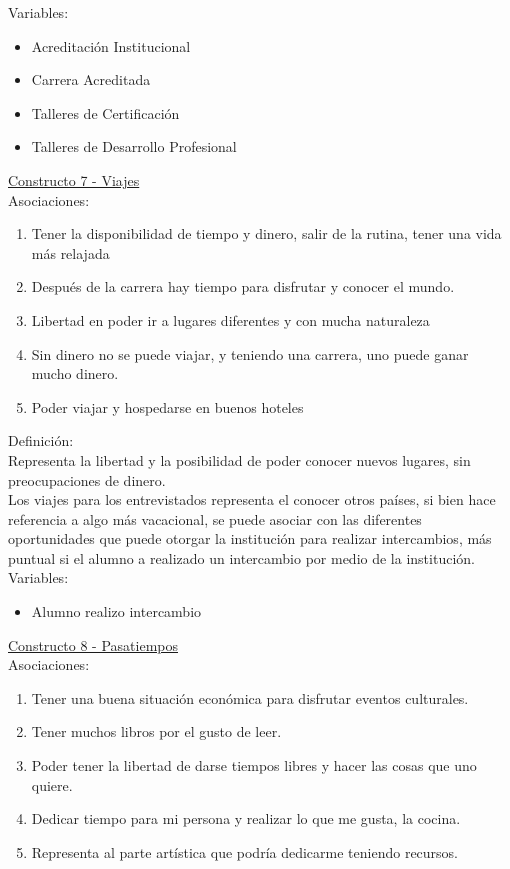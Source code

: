 Variables:\\
\begin{itemize}
	\item Acreditación Institucional
	\item Carrera Acreditada
	\item Talleres de Certificación
	\item Talleres de Desarrollo Profesional	
\end{itemize} 



\underline {Constructo 7 - Viajes} \\
Asociaciones:
\begin{enumerate}
	\item Tener la disponibilidad de tiempo y dinero, salir de la rutina, tener una vida más relajada
	\item Después de la carrera hay tiempo para disfrutar y conocer el mundo. 
	\item Libertad en poder ir a lugares diferentes y con mucha naturaleza
	\item Sin dinero no se puede viajar, y teniendo una carrera, uno puede ganar mucho dinero.	
	\item Poder viajar y hospedarse en buenos hoteles
\end{enumerate}

Definición:\\
Representa la libertad y la posibilidad de poder conocer nuevos lugares, sin preocupaciones de dinero.\\

Los viajes para los entrevistados representa el conocer otros países, si bien hace referencia a algo más vacacional, se puede asociar con las diferentes oportunidades que puede otorgar la institución para realizar intercambios, más puntual si el alumno a realizado un intercambio por medio de la institución.\\

Variables:\\
\begin{itemize}
	\item Alumno realizo intercambio
\end{itemize}


\underline {Constructo 8 - Pasatiempos} \\
Asociaciones:
\begin{enumerate}
	\item Tener una buena situación económica para disfrutar eventos culturales.
	\item Tener muchos libros por el gusto de leer.
	\item Poder tener la libertad de darse tiempos libres y hacer las cosas que uno quiere.
	\item Dedicar tiempo para mi persona y realizar lo que me gusta, la cocina.	
	\item Representa al parte artística que podría dedicarme teniendo recursos.
\end{enumerate}


